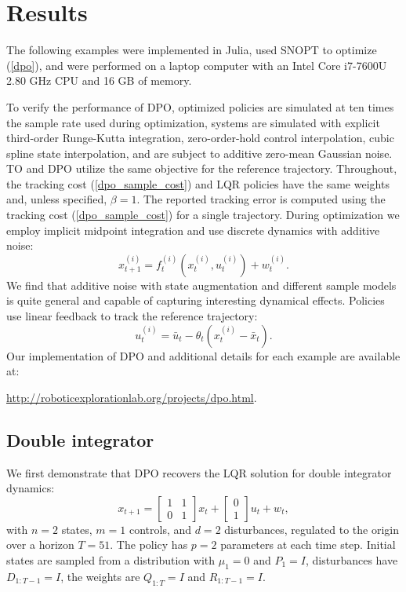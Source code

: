 \section{Results}\label{dpo_results}
The following examples were implemented in Julia, used SNOPT to optimize (\ref{dpo}), and were performed on a laptop computer with an Intel Core i7-7600U 2.80 GHz CPU and 16 GB of memory.

To verify the performance of DPO, optimized policies are simulated at ten times the sample rate used during optimization, systems are simulated with explicit third-order Runge-Kutta integration, zero-order-hold control interpolation, cubic spline state interpolation, and are subject to additive zero-mean Gaussian noise. TO and DPO utilize the same objective for the reference trajectory. Throughout, the tracking cost (\ref{dpo_sample_cost}) and LQR policies have the same weights and, unless specified, $\beta = 1$. The reported tracking error is computed using the tracking cost (\ref{dpo_sample_cost}) for a single trajectory. During optimization we employ implicit midpoint integration and use discrete dynamics with additive noise:
\begin{equation}
	x^{(i)}_{t+1} = f^{(i)}_t(x^{(i)}_t,u^{(i)}_t) + w^{(i)}_t.
	\label{dpo_dynamics_add_noise}
\end{equation} We find that additive noise with state augmentation and different sample models is quite general and capable of capturing interesting dynamical effects. Policies use linear feedback to track the reference trajectory:
\begin{equation}
	u^{(i)}_t = \bar{u}_t - \theta_t (x^{(i)}_t - \bar{x}_t). \label{dpo_linear_policy}
\end{equation}
Our implementation of DPO and additional details for each example are available at: 
\begin{center}
\url{http://roboticexplorationlab.org/projects/dpo.html}.
\end{center}

\subsection{Double integrator}
We first demonstrate that DPO recovers the LQR solution for double integrator dynamics:
\begin{equation}
	x_{t+1} = \begin{bmatrix} 1 & 1 \\ 0 & 1 \end{bmatrix}x_t + \begin{bmatrix} 0 \\ 1 \end{bmatrix}u_t + w_t, \label{dpo_double_integrator_dynamics}
\end{equation}
with $n = 2$ states, $m = 1$ controls, and $d = 2$ disturbances, regulated to the origin over a horizon $T = 51$. The policy has $p = 2$ parameters at each time step. Initial states are sampled from a distribution with $\mu_1 = 0$ and $P_1 = I$, disturbances have $D_{1:T-1} = I$, the weights are $Q_{1:T} = I$ and $R_{1:T-1} = I$.


